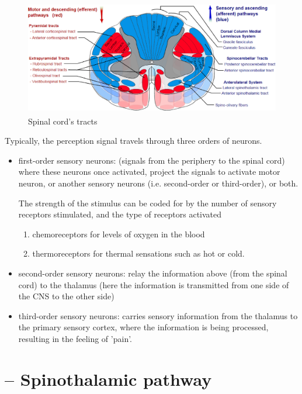 \begin{figure}[hbt]
  \centerline{
  \includegraphics[height=5cm,
    angle=0]{./images/spinal_cord-tracts.eps}}
\caption{Spinal cord's tracts}
\label{fig:spinal_cord-tracts}
\end{figure}


Typically, the perception signal travels through three orders of neurons.
\begin{itemize}
  \item first-order sensory neurons: (signals from the periphery to the spinal
  cord) where these neurons once activated, project the signals to activate
  motor neuron, or another sensory neurons (i.e. second-order or third-order), or both.
  
  
  The strength of the stimulus can be coded for by the number of sensory
  receptors stimulated, and the type of receptors activated
  \begin{enumerate}
    \item chemoreceptors for levels of oxygen in the blood
    \item thermoreceptors for thermal sensations such as hot
or cold.
  \end{enumerate}

  \item second-order sensory neurons: relay the information above (from the
  spinal cord) to the thalamus (here the information is transmitted from one
  side of the CNS to the other side)
  
  
  
  \item third-order sensory neurons: carries sensory information from
the thalamus to the primary sensory cortex, where the information is
being processed, resulting in the feeling of 'pain'.
\end{itemize}

\section{-- Spinothalamic pathway}

